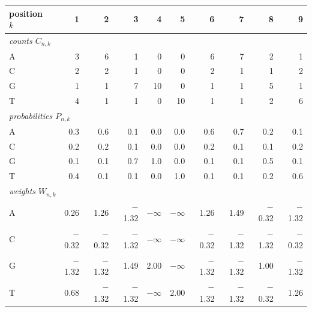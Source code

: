 \begin{tabular}{l*{9}{r}}
\toprule
position $k$ & 1 & 2 & 3 & 4 & 5 & 6 & 7 & 8 & 9 \\
\midrule
\multicolumn{10}{l}{\emph{counts $C_{n,k}$}} \\
A & 3 & 6 & 1 & 0 & 0 & 6 & 7 & 2 & 1 \\
C & 2 & 2 & 1 & 0 & 0 & 2 & 1 & 1 & 2 \\
G & 1 & 1 & 7 & 10 & 0 & 1 & 1 & 5 & 1 \\
T & 4 & 1 & 1 & 0 & 10 & 1 & 1 & 2 & 6 \\
\midrule
\multicolumn{10}{l}{\emph{probabilities $P_{n,k}$}} \\
A & 0.3 & 0.6 & 0.1 & 0.0 & 0.0 & 0.6 & 0.7 & 0.2 & 0.1 \\
C & 0.2 & 0.2 & 0.1 & 0.0 & 0.0 & 0.2 & 0.1 & 0.1 & 0.2 \\
G & 0.1 & 0.1 & 0.7 & 1.0 & 0.0 & 0.1 & 0.1 & 0.5 & 0.1 \\
T & 0.4 & 0.1 & 0.1 & 0.0 & 1.0 & 0.1 & 0.1 & 0.2 & 0.6 \\
\midrule
\multicolumn{10}{l}{\emph{weights $W_{n,k}$}} \\
A & 0.26 & 1.26 & $-$1.32 & $-\infty$ & $-\infty$ & 1.26 & 1.49 & $-$0.32 & $-$1.32 \\
C & $-$0.32 & $-$0.32 & $-$1.32 & $-\infty$ & $-\infty$ & $-$0.32 & $-$1.32 & $-$1.32 & $-$0.32 \\
G & $-$1.32 & $-$1.32 & 1.49 & 2.00 & $-\infty$ & $-$1.32 & $-$1.32 & 1.00 & $-$1.32 \\
T & 0.68 & $-$1.32 & $-$1.32 & $-\infty$ & 2.00 & $-$1.32 & $-$1.32 & $-$0.32 & 1.26 \\
\bottomrule
\end{tabular}
